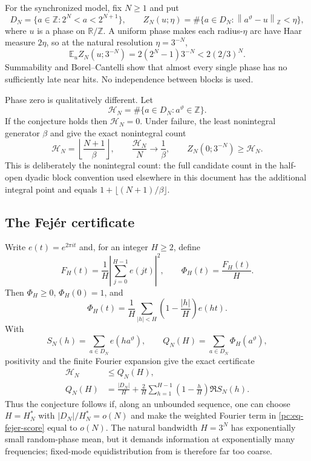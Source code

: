 \documentclass[11pt,oneside]{article}
\theoremstyle{definition}
\theoremstyle{remark}
\newcommand{\Z}{\mathbb Z}
\newcommand{\R}{\mathbb R}
\newcommand{\thetaq}{\vartheta}
\newcommand{\distZ}[1]{\left\lVert #1\right\rVert_{\Z}}
\newcommand{\lean}[1]{\texttt{\detokenize{#1}}}
\begin{document}
For the synchronized model, fix $N\ge1$ and put
\[
 D_N=\{a\in\Z:2^N<a<2^{N+1}\},\qquad
 Z_N(u;\eta)=\#\{a\in D_N:\distZ{a^{\thetaq}-u}<\eta\},
\]
where $u$ is a phase on $\R/\Z$.  A uniform phase makes each radius-$\eta$ arc have Haar
measure $2\eta$, so at the natural resolution $\eta=3^{-N}$,
\begin{equation}
 \mathbb E_u Z_N(u;3^{-N})
 =2(2^N-1)3^{-N}<2(2/3)^N.
 \label{pc:eq-random-phase}
\end{equation}
Summability and Borel--Cantelli show that almost every single phase has no sufficiently late
near hits.  No independence between blocks is used.

Phase zero is qualitatively different.  Let
\[
 \mathcal H_N=\#\{a\in D_N:a^{\thetaq}\in\Z\}.
\]
If the conjecture holds then $\mathcal H_N=0$.  Under failure, the least nonintegral generator
$\beta$ and \lean{ExactCounting} give the exact nonintegral count
\begin{equation}
 \mathcal H_N=\left\lfloor\frac{N+1}{\beta}\right\rfloor,
 \qquad \frac{\mathcal H_N}{N}\longrightarrow\frac1\beta,
 \qquad Z_N(0;3^{-N})\ge\mathcal H_N.
 \label{pc:eq-phase-zero}
\end{equation}
This is deliberately the nonintegral count: the full candidate count in the half-open dyadic
block convention used elsewhere in this document has the additional integral point and equals
$1+\lfloor(N+1)/\beta\rfloor$.

\subsection{The Fej\'er certificate}
\label{pc:fejer}

Write $e(t)=e^{2\pi i t}$ and, for an integer $H\ge2$, define
\[
 F_H(t)=\frac1H\left|\sum_{j=0}^{H-1}e(jt)\right|^2,
 \qquad \Phi_H(t)=\frac{F_H(t)}H.
\]
Then $\Phi_H\ge0$, $\Phi_H(0)=1$, and
\[
 \Phi_H(t)=\frac1H\sum_{|h|<H}
   \left(1-\frac{|h|}{H}\right)e(ht).
\]
With
\[
 S_N(h)=\sum_{a\in D_N}e(ha^{\thetaq}),\qquad
 Q_N(H)=\sum_{a\in D_N}\Phi_H(a^{\thetaq}),
\]
positivity and the finite Fourier expansion give the exact certificate
\begin{align}
 \mathcal H_N&\le Q_N(H),\label{pc:eq-hit-score}\\
 Q_N(H)&=\frac{|D_N|}{H}+
 \frac2H\sum_{h=1}^{H-1}\left(1-\frac hH\right)\Re S_N(h).
 \label{pc:eq-fejer-score}
\end{align}
Thus the conjecture follows if, along an unbounded sequence, one can choose $H=H_N^*$ with
$|D_N|/H_N^*=o(N)$ and make the weighted Fourier term in
\eqref{pc:eq-fejer-score} equal to $o(N)$.  The natural bandwidth $H=3^N$ has exponentially
small random-phase mean, but it demands information at exponentially many frequencies;
fixed-mode equidistribution from \lean{BlockWeyl} is therefore far too coarse.
\end{document}
